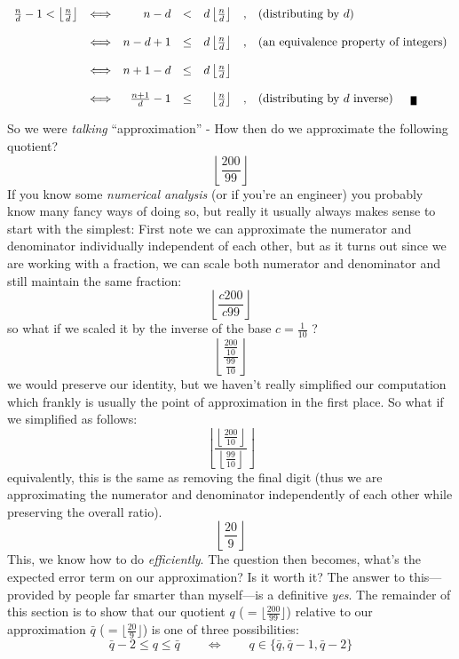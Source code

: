\documentclass[twoside]{article}
\newenvironment{proof}[1][Proof]{\begin{trivlist}
\item[\hskip \labelsep {\bfseries #1}]}{\end{trivlist}}
\newcommand{\qed}{\nobreak \ifvmode \relax \else
      \ifdim\lastskip<1.5em \hskip-\lastskip
      \hskip1.5em plus0em minus0.5em \fi \nobreak
      \vrule height0.5em width0.5em depth0.25em\fi}
\begin{document}
\begin{proof}

$$ \begin{array}{rcrcrll}
\frac{n}{d}-1 < \left\lfloor\frac{n}{d}\right\rfloor
	& \Longleftrightarrow	& n-d	& <	& d\left\lfloor\frac{n}{d}\right\rfloor & , & \mbox{(distributing by $ d $)} \\
	&			&     	&	&					&   &		\\
	& \Longleftrightarrow	& n-d+1 & \le	& d\left\lfloor\frac{n}{d}\right\rfloor & , & \mbox{(an equivalence property of integers)} \\
	&		  	&     	&	&					&   &		\\
	& \Longleftrightarrow	& n+1-d & \le	& d\left\lfloor\frac{n}{d}\right\rfloor &   & 		\\
	&		  	&     	&	&					&   &		\\
	& \Longleftrightarrow	& \frac{n+1}{d}-1 & \le & \left\lfloor\frac{n}{d}\right\rfloor & , & \mbox{(distributing by $ d $ inverse)}\qed
\end{array} $$
\end{proof}

So we were \emph{talking} ``approximation'' - How then do we approximate the following quotient?
$$ \left\lfloor\frac{200}{99}\right\rfloor $$
If you know some \emph{numerical analysis} (or if you're an engineer) you probably know many fancy ways of doing so,
but really it usually always makes sense to start with the simplest: First note we can approximate the numerator
and denominator individually independent of each other, but as it turns out since we are working with a fraction,
we can scale both numerator and denominator and still maintain the same fraction:
$$ \left\lfloor\frac{c200}{c99}\right\rfloor $$
so what if we scaled it by the inverse of the base $ c=\frac{1}{10} $ ?
$$ \left\lfloor\frac{\frac{200}{10}}{\frac{99}{10}}\right\rfloor $$
we would preserve our identity, but we haven't really simplified our computation which frankly is usually the point
of approximation in the first place. So what if we simplified as follows:
$$ \left\lfloor\frac{\left\lfloor\frac{200}{10}\right\rfloor}{\left\lfloor\frac{99}{10}\right\rfloor}\right\rfloor $$
equivalently, this is the same as removing the final digit (thus we are approximating the numerator and denominator
independently of each other while preserving the overall ratio).
$$ \left\lfloor\frac{20}{9}\right\rfloor $$
This, we know how to do \emph{efficiently}. The question then becomes, what's the expected error term on our approximation?
Is it worth it?  The answer to this---provided by people far smarter than myself---is a definitive \emph{yes}. The remainder
of this section is to show that our quotient $ q $ ($ =\lfloor\frac{200}{99}\rfloor $) relative to our approximation
$ \bar{q} $ ($ =\lfloor\frac{20}{9}\rfloor $) is one of three possibilities:
$$ \bar{q}-2\le q\le\bar{q}\qquad\Longleftrightarrow\qquad q\in\{\bar{q},\bar{q}-1,\bar{q}-2\} $$
\end{document}
